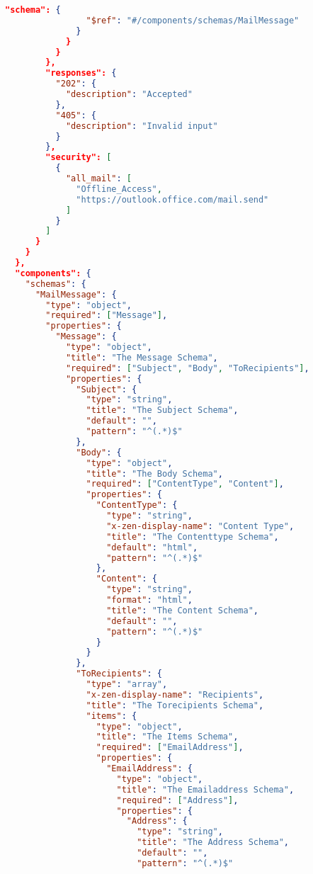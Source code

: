 \begin{lstlisting}[language=json,basicstyle=\ttfamily\tiny,numberstyle=\tiny]
              "schema": {
                "$ref": "#/components/schemas/MailMessage"
              }
            }
          }
        },
        "responses": {
          "202": {
            "description": "Accepted"
          },
          "405": {
            "description": "Invalid input"
          }
        },
        "security": [
          {
            "all_mail": [
              "Offline_Access",
              "https://outlook.office.com/mail.send"
            ]
          }
        ]
      }
    }
  },
  "components": {
    "schemas": {
      "MailMessage": {
        "type": "object",
        "required": ["Message"],
        "properties": {
          "Message": {
            "type": "object",
            "title": "The Message Schema",
            "required": ["Subject", "Body", "ToRecipients"],
            "properties": {
              "Subject": {
                "type": "string",
                "title": "The Subject Schema",
                "default": "",
                "pattern": "^(.*)$"
              },
              "Body": {
                "type": "object",
                "title": "The Body Schema",
                "required": ["ContentType", "Content"],
                "properties": {
                  "ContentType": {
                    "type": "string",
                    "x-zen-display-name": "Content Type",
                    "title": "The Contenttype Schema",
                    "default": "html",
                    "pattern": "^(.*)$"
                  },
                  "Content": {
                    "type": "string",
                    "format": "html",
                    "title": "The Content Schema",
                    "default": "",
                    "pattern": "^(.*)$"
                  }
                }
              },
              "ToRecipients": {
                "type": "array",
                "x-zen-display-name": "Recipients",
                "title": "The Torecipients Schema",
                "items": {
                  "type": "object",
                  "title": "The Items Schema",
                  "required": ["EmailAddress"],
                  "properties": {
                    "EmailAddress": {
                      "type": "object",
                      "title": "The Emailaddress Schema",
                      "required": ["Address"],
                      "properties": {
                        "Address": {
                          "type": "string",
                          "title": "The Address Schema",
                          "default": "",
                          "pattern": "^(.*)$"

\end{lstlisting}
